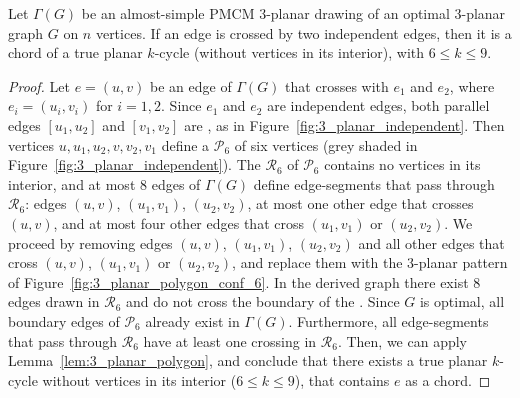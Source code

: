 \begin{lemma}\label{lem:3_planar_independent}
Let $\Gamma(G)$ be an almost-simple PMCM $3$-planar drawing of an optimal $3$-planar graph $G$ on $n$ vertices. If an edge is crossed by two independent edges, then it is a chord of a true planar $k$-cycle (without vertices in its interior), with $6\leq k\leq 9$.
\end{lemma}
\begin{proof}
Let $e=(u,v)$ be an edge of $\Gamma(G)$ that crosses with  $e_1$ and $e_2$, where $e_i=(u_i,v_i)$ for $i=1,2$. Since $e_1$ and $e_2$ are independent edges, both parallel edges $[u_1,u_2]$ and $[v_1,v_2]$ are \pes, as in Figure~\ref{fig:3_planar_independent}. Then vertices $u,u_1,u_2,v,v_2,v_1$ define a \pp $\mathcal{P}_6$ of six vertices (grey shaded in Figure~\ref{fig:3_planar_independent}). The \pr $\mathcal{R}_6$ of $\mathcal{P}_6$ contains no vertices in its interior, and at most $8$ edges of $\Gamma(G)$ define edge-segments that pass through $\mathcal{R}_6$: edges $(u,v)$, $(u_1,v_1)$, $(u_2,v_2)$, at most one other edge that crosses $(u,v)$, and at most four other edges that cross $(u_1,v_1)$ or $(u_2,v_2)$. We proceed by removing  edges $(u,v)$, $(u_1,v_1)$, $(u_2,v_2)$ and all other edges that cross $(u,v)$, $(u_1,v_1)$ or $(u_2,v_2)$, and replace them with the $3$-planar pattern of Figure~\ref{fig:3_planar_polygon_conf_6}. In the derived graph there exist $8$ edges drawn in $\mathcal{R}_6$ and do not cross the boundary of the \pp. Since $G$ is optimal, all boundary edges of $\mathcal{P}_6$ already exist in $\Gamma(G)$. Furthermore, all edge-segments that pass through $\mathcal{R}_6$ have at least one crossing in $\mathcal{R}_6$. Then, we can apply Lemma~\ref{lem:3_planar_polygon}, and conclude that there exists a true planar $k$-cycle without vertices in its interior ($6\leq k\leq 9$), that contains $e$ as a chord.
\end{proof}

